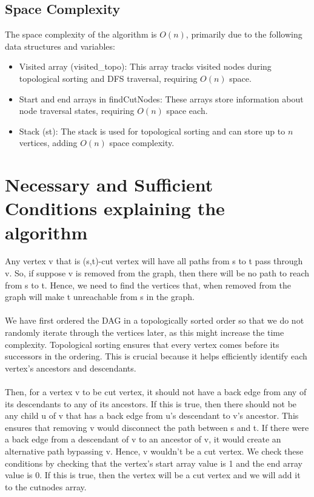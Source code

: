 \documentclass{article}
\begin{document}
    \subsection{Space Complexity}
        The space complexity of the algorithm is $O(n)$, primarily due to the following data structures and variables:
        \begin{itemize}
            \item Visited array (visited\_topo): This array tracks visited nodes during topological sorting and DFS traversal, requiring $O(n)$ space.
            \item Start and end arrays in findCutNodes: These arrays store information about node traversal states, requiring $O(n)$ space each.
            \item Stack (st): The stack is used for topological sorting and can store up to $n$ vertices, adding $O(n)$ space complexity.
        \end{itemize}


\section{Necessary and Sufficient Conditions explaining the algorithm}
    Any vertex v that is (s,t)-cut vertex will have all paths from s to t pass through v. So, if suppose v is removed from the graph, then there will be no path to reach from s to t. Hence, we need to find the vertices that, when removed from the graph will make t unreachable from s in the graph.
    \\\\
    We have first ordered the DAG in a topologically sorted order so that we do not randomly iterate through the vertices later, as this might increase the time complexity. Topological sorting ensures that every vertex comes before its successors in the ordering. This is crucial because it helps efficiently identify each vertex's ancestors and descendants.
    \\\\
    Then, for a vertex v to be cut vertex, it should not have a back edge from any of its descendants to any of its ancestors. If this is true, then there should not be any child u of v that has a back edge from u's descendant to v's ancestor. This ensures that removing v would disconnect the path between s and t. If there were a back edge from a descendant of v to an ancestor of v, it would create an alternative path bypassing v. Hence, v wouldn't be a cut vertex. We check these conditions by checking that the vertex's start array value is 1 and the end array value is 0. If this is true, then the vertex will be a cut vertex and we will add it to the cutnodes array.
\end{document}
